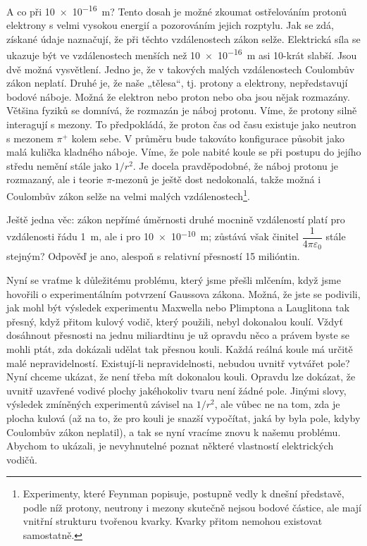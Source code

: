 {  A co při \SI{10e-16}{\meter}? Tento dosah je možné zkoumat ostřelováním protonů elektrony s 
  velmi vysokou energií a pozorováním jejich rozptylu. Jak se zdá, získané údaje naznačují, že 
  při těchto vzdálenostech zákon selže. Elektrická síla se ukazuje být ve vzdálenostech menších 
  než \SI{10e-16}{\meter} asi 10-krát slabší. Jsou dvě možná vysvětlení. Jedno je, že v 
  takových malých vzdálenostech Coulombův zákon neplatí. Druhé je, že naše „tělesa“, tj. 
  protony a elektrony, nepředstavují bodové náboje. Možná že elektron nebo proton nebo oba jsou 
  nějak rozmazány. Většina fyziků se domnívá, že rozmazán je náboj protonu. Víme, že protony 
  silně interagují s mezony. To předpokládá, že proton čas od času existuje jako neutron s 
  mezonem \(\pi^+\) kolem sebe. V průměru bude takováto konfigurace působit jako malá kulička 
  kladného náboje. Víme, že pole nabité koule se při postupu do jejího středu nemění stále jako 
  \(1/r^2\). Je docela pravděpodobné, že náboj protonu je rozmazaný, ale i teorie 
  \(\pi\text{-mezonů}\) je ještě dost nedokonalá, takže možná i Coulombův zákon selže na velmi 
  malých vzdálenostech\footnote{Experimenty, které Feynman popisuje, postupně vedly k dnešní 
  představě, podle níž protony, neutrony i mezony skutečně nejsou bodové částice, ale mají 
  vnitřní strukturu tvořenou kvarky. Kvarky přitom nemohou existovat samostatně.}.
  
  Ještě jedna věc: zákon nepřímé úměrnosti druhé mocnině vzdáleností platí pro vzdálenosti řádu 
  \SI{1}{\meter}, ale i pro \newline\SI{10e-10}{\meter}; zůstává však činitel 
  \(\dfrac{1}{4\pi\varepsilon_0}\) stále stejným? Odpověď je ano, alespoň s relativní přesností 
  15 milióntin.
  
  Nyní se vraťme k důležitému problému, který jsme přešli mlčením, když jsme hovořili o 
  experimentálním potvrzení Gaussova zákona. Možná, že jste se podivili, jak mohl být výsledek 
  experimentu Maxwella nebo Plimptona a Lauglitona tak přesný, když přitom kulový vodič, který 
  použili, nebyl dokonalou koulí. Vždyť dosáhnout přesnosti na jednu miliardtinu je už opravdu 
  něco a právem byste se mohli ptát, zda dokázali udělat tak přesnou kouli. Každá reálná koule 
  má určitě malé nepravidelností. Existují-li nepravidelnosti, nebudou uvnitř vytvářet pole? 
  Nyní chceme ukázat, že není třeba mít dokonalou kouli. Opravdu lze dokázat, že uvnitř 
  uzavřené vodivé plochy jakéhokoliv tvaru není žádné pole. Jinými slovy, výsledek zmíněných 
  experimentů závisel na \(1/r^2\), ale vůbec ne na tom, zda je plocha kulová (až na to, že pro 
  kouli je snazší vypočítat, jaká by byla pole, kdyby Coulombův zákon neplatil), a tak se nyní 
  vracíme znovu k našemu problému. Abychom to ukázali, je nevyhnutelné poznat některé 
  vlastností elektrických vodičů.
  
}
